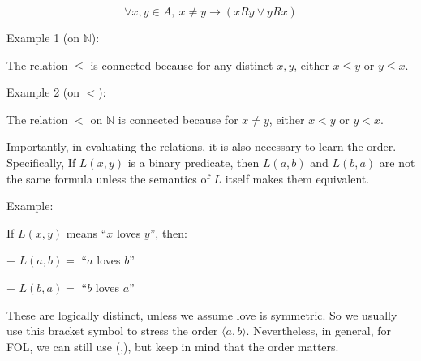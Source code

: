 \[\forall x,y \in A,\ x \neq y \to (xRy \lor yRx)\]

Example 1 (on \(\mathbb{N}\)):

The relation \(\leq\) is connected because for any distinct \(x,y\),
either \(x \leq y\) or \(y \leq x\).

Example 2 (on \(<\)):

The relation \(<\) on \(\mathbb{N}\) is connected because for
\(x \ne y\), either \(x < y\) or \(y < x\).

Importantly, in evaluating the relations, it is also necessary to learn
the order. Specifically, If \(L(x,y)\) is a binary predicate, then
\(L(a,b)\) and \(L(b,a)\) are not the same formula unless the semantics
of \(L\) itself makes them equivalent.

Example:

If \(L(x,y)\) means ``\(x\) loves \(y\)'', then:

− \(L(a,b) =\) ``\(a\) loves \(b\)''

− \(L(b,a) =\) ``\(b\) loves \(a\)''

These are logically distinct, unless we assume love is symmetric. So we
usually use this bracket symbol to stress the order
\(\langle a, b \rangle\). Nevertheless, in general, for FOL, we can
still use (,), but keep in mind that the order matters.
